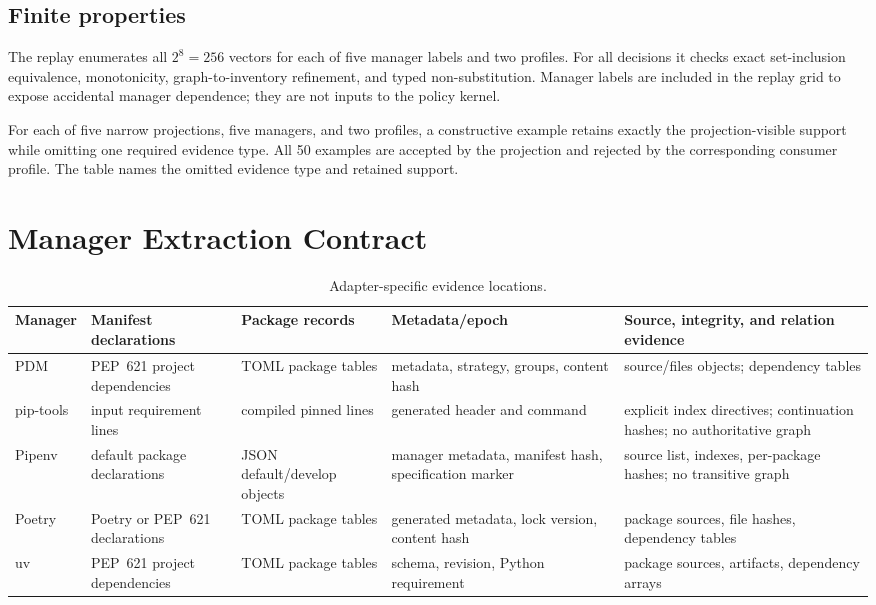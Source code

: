 \documentclass[10pt,conference]{IEEEtran}
\begin{document}
\subsection{Finite properties}
The replay enumerates all $2^8=256$ vectors for each of five manager labels and two profiles. For all \ProofDecisions{} decisions it checks exact set-inclusion equivalence, monotonicity, graph-to-inventory refinement, and typed non-substitution. Manager labels are included in the replay grid to expose accidental manager dependence; they are not inputs to the policy kernel.

For each of five narrow projections, five managers, and two profiles, a constructive example retains exactly the projection-visible support while omitting one required evidence type. All 50 examples are accepted by the projection and rejected by the corresponding consumer profile. The table names the omitted evidence type and retained support.

\section{Manager Extraction Contract}
\begin{table}[t]
\caption{Adapter-specific evidence locations.}
\centering\small
\begin{tabularx}{\textwidth}{p{}p{}p{}X X}
\toprule
Manager & Manifest declarations & Package records & Metadata/epoch & Source, integrity, and relation evidence\\
\midrule
PDM & PEP~621 project dependencies & TOML package tables & metadata, strategy, groups, content hash & source/files objects; dependency tables\\
pip-tools & input requirement lines & compiled pinned lines & generated header and command & explicit index directives; continuation hashes; no authoritative graph\\
Pipenv & default package declarations & JSON default/develop objects & manager metadata, manifest hash, specification marker & source list, indexes, per-package hashes; no transitive graph\\
Poetry & Poetry or PEP~621 declarations & TOML package tables & generated metadata, lock version, content hash & package sources, file hashes, dependency tables\\
uv & PEP~621 project dependencies & TOML package tables & schema, revision, Python requirement & package sources, artifacts, dependency arrays\\
\bottomrule
\end{tabularx}
\end{table}
\end{document}
